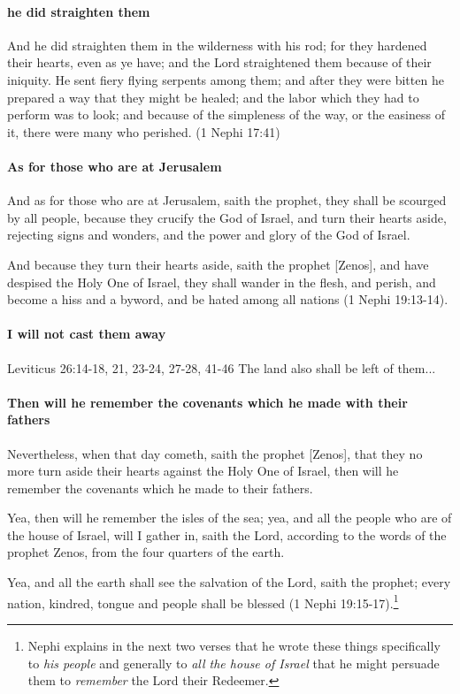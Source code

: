 \paragraph{he did straighten them}
And he did straighten them in the wilderness with his rod; for they hardened their hearts, even as ye have; and the Lord straightened them because of their iniquity. He sent fiery flying serpents among them; and after they were bitten he prepared a way that they might be healed; and the labor which they had to perform was to look; and because of the simpleness of the way, or the easiness of it, there were many who perished. (1 Nephi 17:41)

\paragraph{As for those who are at Jerusalem}
And as for those who are at Jerusalem, saith the prophet, they shall be scourged by all people, because they crucify the God of Israel, and turn their hearts aside, rejecting signs and wonders, and the power and glory of the God of Israel.

And because they turn their hearts aside, saith the prophet [Zenos], and have despised the Holy One of Israel, they shall wander in the flesh, and perish, and become a hiss and a byword, and be hated among all nations (1 Nephi 19:13-14).

\paragraph{I will not cast them away}
Leviticus 26:14-18, 21, 23-24, 27-28, 41-46
The land also shall be left of them...

\paragraph{Then will he remember the covenants which he made with their fathers}
Nevertheless, when that day cometh, saith the prophet [Zenos], that they no more turn aside their hearts against the Holy One of Israel, then will he remember the covenants which he made to their fathers.

Yea, then will he remember the isles of the sea; yea, and all the people who are of the house of Israel, will I gather in, saith the Lord, according to the words of the prophet Zenos, from the four quarters of the earth.

Yea, and all the earth shall see the salvation of the Lord, saith the prophet; every nation, kindred, tongue and people shall be blessed (1 Nephi 19:15-17).\footnote{Nephi explains in the next two verses that he wrote these things specifically to \textit{his people} and generally to \textit{all the house of Israel} that he might persuade them to \textit{remember} the Lord their Redeemer.}

